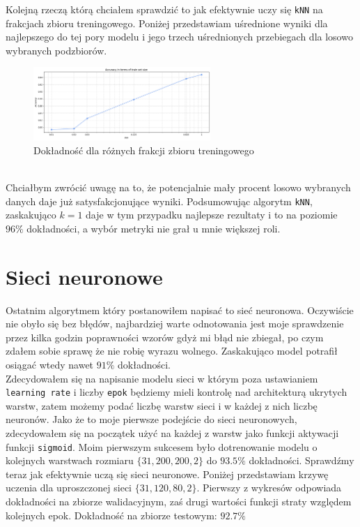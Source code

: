 \documentclass[polish,12pt,a4paper]{extarticle}
\begin{document}
Kolejną rzeczą którą chciałem sprawdzić to jak efektywnie uczy się \texttt{kNN} na frakcjach zbioru treningowego. Poniżej przedstawiam uśrednione wyniki dla najlepszego do tej pory modelu i jego trzech uśrednionych przebiegach dla losowo wybranych podzbiorów.
\begin{figure}[h!]
    \centering
    \includegraphics[width=0.60\textwidth]{img/accuracy_size.png}
    \caption{Dokładność dla różnych frakcji zbioru treningowego}
\end{figure} \FloatBarrier \\
Chciałbym zwrócić uwagę na to, że potencjalnie mały procent losowo wybranych danych daje już satysfakcjonujące wyniki. Podsumowując algorytm \texttt{kNN}, zaskakująco $k = 1$ daje w tym przypadku najlepsze rezultaty i to na poziomie $96\%$ dokładności, a wybór metryki nie grał u mnie większej roli.

\section*{Sieci neuronowe}
Ostatnim algorytmem który postanowiłem napisać to sieć neuronowa. Oczywiście nie obyło się bez błędów, najbardziej warte odnotowania jest moje sprawdzenie przez kilka godzin poprawności wzorów gdyż mi błąd nie zbiegał, po czym zdałem sobie sprawę że nie robię wyrazu wolnego. Zaskakująco model potrafił osiągać wtedy nawet $91\%$ dokładności. \smallskip \\
Zdecydowałem się na napisanie modelu sieci w którym poza ustawianiem \texttt{learning rate} i liczby \texttt{epok} będziemy mieli kontrolę nad architekturą ukrytych warstw, zatem możemy podać liczbę warstw sieci i w każdej z nich liczbę neuronów. Jako że to moje pierwsze podejście do sieci neuronowych, zdecydowałem się na początek użyć na każdej z warstw jako funkcji aktywacji funkcji \texttt{sigmoid}.
Moim pierwszym sukcesem było dotrenowanie modelu o kolejnych warstwach rozmiaru $\{31, 200, 200, 2\}$ do $93.5\%$ dokładności. Sprawdźmy teraz jak efektywnie uczą się sieci neuronowe. Poniżej przedstawiam krzywę uczenia dla uproszczonej sieci $\{31, 120, 80, 2\}$. Pierwszy z wykresów odpowiada dokładności na zbiorze walidacyjnym, zaś drugi wartości funkcji straty względem kolejnych epok. Dokładność na zbiorze testowym: $92.7\%$
\end{document}
